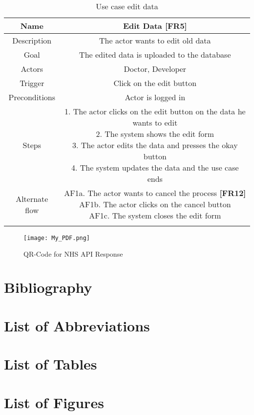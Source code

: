 \begin{table}[H]
	\begin{center}\scriptsize
		\begin{tabular}{ |c|c| }
			\hline
			Name & Edit Data \textbf{[FR5]} \\ 
			\hline	
			Description & The actor wants to edit old data \\ 
			\hline
			Goal & The edited data is uploaded to the database \\ 
			\hline
			Actors & Doctor, Developer \\ 
			\hline
			Trigger & Click on the edit button \\ 
			\hline
			Preconditions & Actor is logged in \\ 
			\hline
			Steps & \parbox{9cm}{\vspace{.5\baselineskip}
				1. The actor clicks on the edit button on the data he wants to edit\\
				2. The system shows the edit form\\
				3. The actor edits the data and presses the okay button\\
				4. The system updates the data and the use case ends
			}\\
			\hline
			Alternate flow & \parbox{9cm}{\vspace{.5\baselineskip}
				AF1a. The actor wants to cancel the process \textbf{[FR12]}\\
				AF1b. The actor clicks on the cancel button\\
				AF1c. The system closes the edit form}\\ \\ 
			\hline
		\end{tabular}
	\end{center}\normalsize
	\caption{Use case edit data}
\end{table}
\begin{figure}[H]
	\centering
	\texttt{[image: My\_PDF.png]}
	\caption[QR-Code for NHS API Response]{QR-Code for NHS API Response}
\end{figure}
\chapter{Bibliography}

\chapter{List of Abbreviations}

\chapter{List of Tables}

\chapter{List of Figures}